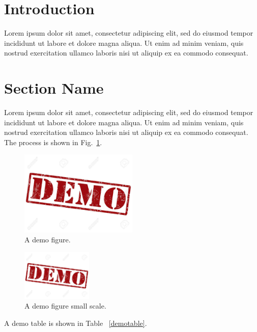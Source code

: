 \section{Introduction}
Lorem ipsum dolor sit amet, consectetur adipiscing elit, sed do eiusmod tempor incididunt ut labore et dolore magna aliqua. Ut enim ad minim veniam, quis nostrud exercitation ullamco laboris nisi ut aliquip ex ea commodo consequat.

\section{Section Name}
Lorem ipsum dolor sit amet, consectetur adipiscing elit, sed do eiusmod tempor incididunt ut labore et dolore magna aliqua. Ut enim ad minim veniam, quis nostrud exercitation ullamco laboris nisi ut aliquip ex ea commodo consequat. The process is shown in Fig.~\ref{demofig}.\\
\begin{figure}[h]
\centering
\includegraphics[width=0.5\textwidth]{images/demo.jpg}
\caption{A demo figure.}
\label{demofig}
\end{figure}

\begin{figure}[h]
\centering
\includegraphics[width=0.3\textwidth]{images/demo.jpg}
\caption{A demo figure small scale.}
\label{demofigsmall}
\end{figure}

A demo table is shown in Table ~\ref{demotable}.\\

